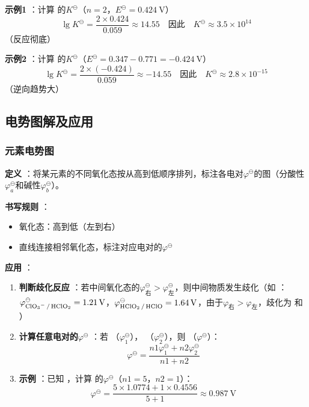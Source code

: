 \textbf{示例1} ：计算  的\( K^\ominus \)（\( n=2 \)，\( E^\ominus = \qty{0.424}{\volt}  \)）
\[
\lg K^\ominus = \frac{2 \times 0.424}{0.059}  \approx 14.55\quad\text{因此} \quad K^\ominus \approx 3.5 \times 10^{14} 
\]
（反应彻底）

\textbf{示例2} ：计算  的\( K^\ominus \)（\( E^\ominus = 0.347 - 0.771 = \qty{-0.424}{\volt}  \)）
\[
\lg K^\ominus = \frac{2 \times (-0.424)}{0.059}  \approx -14.55\quad\text{因此} \quad K^\ominus \approx 2.8 \times 10^{-15} 
\]
（逆向趋势大）

\subsection{电势图解及应用} 

\subsubsection{元素电势图} 
\textbf{定义} ：将某元素的不同氧化态按从高到低顺序排列，标注各电对\( \varphi^\ominus \)的图（分酸性\( \varphi_a^\ominus \)和碱性\( \varphi_b^\ominus \)）。

\textbf{书写规则} ：
\begin{itemize} 
    \item 氧化态：高到低（左到右）
    \item 直线连接相邻氧化态，标注对应电对的\( \varphi^\ominus \)
\end{itemize} 

\textbf{应用} ：
\begin{enumerate} 
    \item \textbf{判断歧化反应} ：若中间氧化态的\( \varphi_{\text{右} } ^\ominus > \varphi_{\text{左} } ^\ominus \)，则中间物质发生歧化（如  ：\( \varphi_{ \ce{ClO3^- / HClO2} } ^\ominus = \qty{1.21}{\volt}  \)，\( \varphi_{ \ce{HClO2 / HClO} } ^\ominus = \qty{1.64}{\volt}  \)，由于\( \varphi_{\text{右} }  > \varphi_{\text{左} }  \)，歧化为  和  ）
    
    \item \textbf{计算任意电对的\( \varphi^\ominus \)} ：若  （\( \varphi_1^\ominus \)），  （\( \varphi_2^\ominus \)），则  （\( \varphi^\ominus \)）：
    \[
    \varphi^\ominus = \frac{n1\varphi_1^\ominus + n2\varphi_2^\ominus}{n1 + n2} 
    \]
    
    \item \textbf{示例} ：已知  ，计算  的\( \varphi^\ominus \)（\( n1=5 \)，\( n2=1 \)）：
    \[
    \varphi^\ominus = \frac{5 \times 1.0774 + 1 \times 0.4556}{5 + 1}  \approx \qty{0.987}{\volt} 
    \]
\end{enumerate} 

